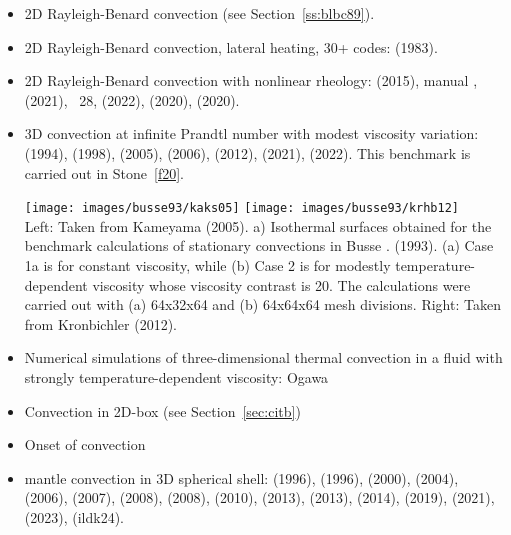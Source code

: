 \begin{itemize}
\item 2D Rayleigh-Benard convection (see Section~\ref{ss:blbc89}).

\item 2D Rayleigh-Benard convection, lateral heating, 30+ codes: 
      \textcite{dejo83} (1983).

\item 2D Rayleigh-Benard convection with nonlinear rheology:  
      \textcite{tosn15} (2015), \aspect{} manual \cite{aspectmanual}, 
      \textcite{trbs21} (2021), \stone~28, \textcite{dakg22} (2022),
      \textcite{siwi20} (2020), \textcite{casd20} (2020).

\item 3D convection at infinite Prandtl number with modest viscosity variation:
      \textcite{bucc94} (1994),
      \textcite{trha98} (1998),
      \textcite{kaks05} (2005),
      \textcite{onmm06} (2006),
      \textcite{krhb12} (2012), 
      \textcite{trbs21} (2021),
      \textcite{dakg22} (2022).
      This benchmark is carried out in Stone~\ref{f20}.

      \begin{center}
      \texttt{[image: images/busse93/kaks05]}
      \texttt{[image: images/busse93/krhb12]}\\
      {\captionfont Left: Taken from Kameyama \etal (2005).
      a) Isothermal surfaces obtained for the benchmark calculations 
      of stationary convections in Busse \etal. (1993). (a) Case 1a is for
      constant viscosity, while (b) Case 2 is for modestly temperature-dependent 
      viscosity whose viscosity contrast is 20. The calculations
      were carried out with (a) 64x32x64 and (b) 64x64x64 mesh divisions.
      Right: Taken from Kronbichler \etal (2012).}
      \end{center}

\item Numerical simulations of three-dimensional thermal convection 
      in a fluid with strongly
      temperature-dependent viscosity: Ogawa \etal \cite{ogsz91,kaks05} 

\item Convection in 2D-box \cite{galb19} (see Section~\ref{sec:citb})

\item Onset of convection \cite{aspectmanual}

\item mantle convection in 3D spherical shell:
      \textcite{rasz96} (1996),
      \textcite{iwas96} (1996),
      \textcite{zhzm00} (2000),
      \textcite{yoka04} (2004),
      \textcite{sthh06} (2006),
      \textcite{chcc07} (2007),
      \textcite{zhmt08} (2008),
      \textcite{kaks08} (2008),
      \textcite{wrfy10} (2010),
      \textcite{dadb13} (2013),
      \textcite{busa13} (2013),
      \textcite{arfw14} (2014),
      \textcite{liki19} (2019),
      \textcite{trbs21} (2021),
      \textcite{eulg23} (2023),
      \textcite{ildk24} (ildk24).


\end{itemize}
